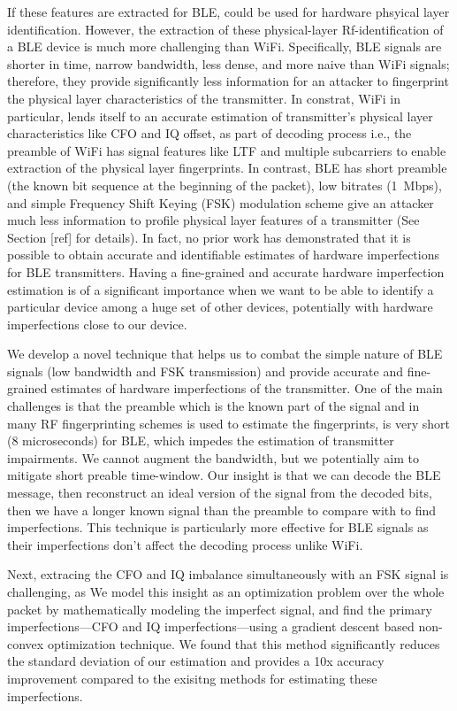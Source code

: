 If these features are extracted for BLE, could be used for hardware phsyical layer identification. 
However, the extraction of these physical-layer Rf-identification of a BLE device is much more 
challenging than WiFi.
%
Specifically, BLE signals are shorter in time, narrow bandwidth, less dense, and more naive than WiFi signals; therefore, they provide significantly less information for an attacker to fingerprint the physical layer characteristics of the transmitter.
%
In constrat, WiFi in particular, lends itself to an accurate estimation of transmitter's physical layer characteristics like CFO and IQ offset, as part of decoding process i.e., the preamble of WiFi has signal features like LTF and multiple subcarriers to enable extraction of the physical layer fingerprints.
In contrast, BLE has short preamble (the known bit sequence at the beginning of the
packet), low bitrates (1~Mbps), and simple
Frequency Shift Keying (FSK) modulation scheme give an attacker much less information to profile 
physical layer features of a transmitter (See Section [ref] for details). In fact, no prior work
 has demonstrated that it is possible to obtain accurate and identifiable estimates of hardware
  imperfections for BLE transmitters. Having a fine-grained and accurate hardware imperfection 
  estimation is of a significant importance when we want to be able to identify a particular 
  device among a huge set of other devices, potentially with hardware imperfections close to our device. 


We develop a novel technique that helps us to combat the simple nature of BLE signals (low bandwidth and FSK transmission) and provide accurate and fine-grained estimates of hardware imperfections of the transmitter. One of the main challenges is that the preamble which is the known part of the signal and in many RF fingerprinting schemes is used to estimate the fingerprints, is very short (8 microseconds) for BLE, which impedes the estimation of transmitter impairments. We cannot augment the bandwidth, but we potentially aim to mitigate short preable time-window. Our insight is that we can decode the BLE message, then reconstruct an ideal
version of the signal from the decoded bits, then we have a longer known signal
than the preamble to compare with to find imperfections. This technique is particularly more effective for BLE signals as their imperfections don't affect the decoding process unlike WiFi.

Next, extracing the CFO and IQ imbalance simultaneously with an FSK signal is challenging, as 
We model this insight as an optimization problem over the whole packet by mathematically modeling the imperfect signal, and find the primary imperfections---CFO and IQ imperfections---using a gradient descent based non-convex optimization technique. We found that this method significantly reduces the standard deviation of our estimation and provides a 10x accuracy improvement compared to the exisitng methods for estimating these imperfections.

